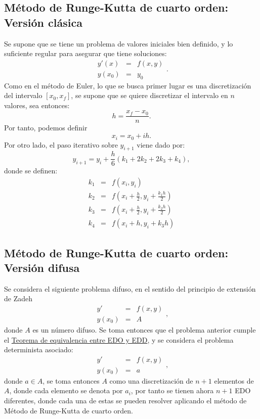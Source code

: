 \subsection{Método de Runge-Kutta de cuarto orden: Versión clásica}
Se supone que se tiene un problema de valores iniciales bien definido, y lo suficiente regular para asegurar que tiene soluciones:
\[
\begin{array}{ccc}
y'(x) & = &f(x, y)  \\
y(x_0) & = & y_0
\end{array}.
\]
Como en el método de Euler, lo que se busca primer lugar es una discretización del intervalo $[x_0, x_f]$, se supone que se quiere discretizar el intervalo en $n$ valores, sea entonces:
\[
	h = \frac{x_f - x_0}{n}.
\]
Por tanto, podemos definir 
\[
	x_i = x_0 + i h.
\]
Por otro lado, el paso iterativo sobre $y_{i+1}$ viene dado por:
\[
	y_{i+1} = y_i + \frac{h}{6} (k_1 + 2k_2 + 2k_3 + k_4),
\]
donde se definen:
\[
\begin{array}{ccc}
	k_1 & = & f(x_i, y_i) \\
	k_2 & = & f\left(x_i + \frac{h}{2}, y_i + \frac{k_1 h}{2}\right) \\
	k_3 & = & f\left(x_i + \frac{h}{2}, y_i + \frac{k_2 h}{2}\right) \\
	k_4 & = & f(x_i + h, y_i + k_3 h)
\end{array}
\]

\subsection{Método de Runge-Kutta de cuarto orden: Versión difusa}
Se considera el siguiente problema difuso, en el sentido del principio de extensión de Zadeh
\[
\begin{array}{ccc}
y' & = &f(x, y)  \\
y(x_0) & = & A
\end{array},
\]
donde $A$ es un número difuso. Se toma entonces que el problema anterior cumple el \hyperref[teorema:equivalencia]{Teorema de equivalencia entre EDO y EDD}, y se considera el problema determinista asociado:
\[
\begin{array}{ccc}
y' & = &f(x, y)  \\
y(x_0) & = & a
\end{array},
\]
donde $a \in A$, se toma entonces $A$ como una discretización de $n+1$ elementos de $A$, donde cada elemento se denota por $a_i$, por tanto se tienen ahora $n+1$ EDO diferentes, donde cada una de estas se pueden resolver aplicando el método de Método de Runge-Kutta de cuarto orden.

